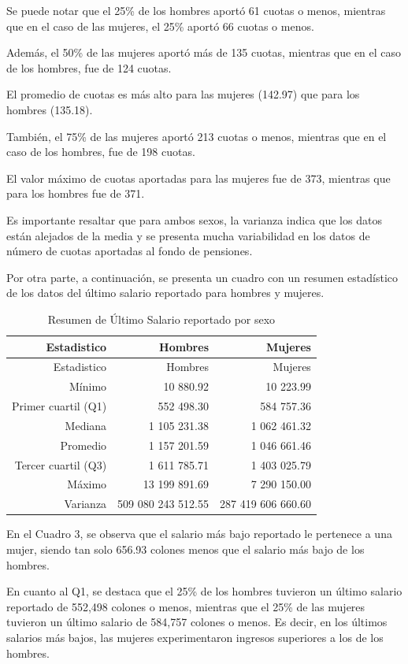 \documentclass[
]{article}
\begin{document}
Se puede notar que el 25\% de los hombres aportó 61 cuotas o menos,
mientras que en el caso de las mujeres, el 25\% aportó 66 cuotas o
menos.

Además, el 50\% de las mujeres aportó más de 135 cuotas, mientras que en
el caso de los hombres, fue de 124 cuotas.

El promedio de cuotas es más alto para las mujeres (142.97) que para los
hombres (135.18).

También, el 75\% de las mujeres aportó 213 cuotas o menos, mientras que
en el caso de los hombres, fue de 198 cuotas.

El valor máximo de cuotas aportadas para las mujeres fue de 373,
mientras que para los hombres fue de 371.

Es importante resaltar que para ambos sexos, la varianza indica que los
datos están alejados de la media y se presenta mucha variabilidad en los
datos de número de cuotas aportadas al fondo de pensiones.

\newpage

Por otra parte, a continuación, se presenta un cuadro con un resumen
estadístico de los datos del último salario reportado para hombres y
mujeres.

\begin{longtable}[]{@{}rrr@{}}
\caption{Resumen de Último Salario reportado por sexo}\tabularnewline
\toprule\noalign{}
Estadistico & Hombres & Mujeres \\
\midrule\noalign{}
\endfirsthead
\toprule\noalign{}
Estadistico & Hombres & Mujeres \\
\midrule\noalign{}
\endhead
\bottomrule\noalign{}
\endlastfoot
Mínimo & 10 880.92 & 10 223.99 \\
Primer cuartil (Q1) & 552 498.30 & 584 757.36 \\
Mediana & 1 105 231.38 & 1 062 461.32 \\
Promedio & 1 157 201.59 & 1 046 661.46 \\
Tercer cuartil (Q3) & 1 611 785.71 & 1 403 025.79 \\
Máximo & 13 199 891.69 & 7 290 150.00 \\
Varianza & 509 080 243 512.55 & 287 419 606 660.60 \\
\end{longtable}

En el Cuadro 3, se observa que el salario más bajo reportado le
pertenece a una mujer, siendo tan solo 656.93 colones menos que el
salario más bajo de los hombres.

En cuanto al Q1, se destaca que el 25\% de los hombres tuvieron un
último salario reportado de 552,498 colones o menos, mientras que el
25\% de las mujeres tuvieron un último salario de 584,757 colones o
menos. Es decir, en los últimos salarios más bajos, las mujeres
experimentaron ingresos superiores a los de los hombres.
\end{document}
